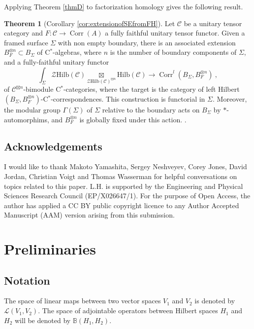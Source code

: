 \documentclass[a4paper,11pt,reqno]{amsart}
\numberwithin{equation}{section}
\theoremstyle{remark}
\theoremstyle{definition}
\newtheorem{theoremAlph}{Theorem}
\newcommand{\bB}{\mathbb B}
\newcommand{\cC}{\mathcal C}
\newcommand{\cL}{\mathcal L}
\newcommand{\cZ}{\mathcal Z}
\DeclareMathOperator{\Corr}{Corr}
\newcommand{\Hilb}{\mathrm{Hilb}}
\begin{document}
Applying Theorem \ref{thmD} to factorization homology gives the following result.

\begin{theoremAlph}[Corollary \ref{cor:extensionofSEfromFH}]
	Let $\cC$ be a unitary tensor category and $F: \cC \to \Corr(A)$ a fully faithful unitary tensor functor. Given a framed surface $\Sigma$ with non empty boundary, there is an associated extension  $B_F^{\otimes n} \subset B_\Sigma$ of C$^*$-algebras, where $n$ is the number of boundary components of $\Sigma$, and a fully-faithful unitary functor
	\[
	\int_\Sigma \cZ \Hilb(\cC) \underset{\cZ \Hilb(\cC)^{\boxtimes n}}{\boxtimes} \Hilb(\cC) \to \Corr^l(B_\Sigma,B_F^{\otimes n}) \ ,
	\]
	of $\cC^{\boxtimes n}$-bimodule C$^*$-categories, where the target is the category of left Hilbert $(B_\Sigma,B_F^{\otimes n})$-C$^*$-correspondences. This construction is functorial in $\Sigma$. Moreover, the modular group $\Gamma(\Sigma)$ of $\Sigma$ relative to the boundary acts on $B_\Sigma$ by $*$-automorphims, and $B_F^{\otimes n}$ is globally fixed under this action. 
	\label{thmE}. 
\end{theoremAlph}




\subsection{Acknowledgements}
I would like to thank Makoto Yamashita, Sergey Neshveyev, Corey Jones, David Jordan, Christian Voigt and Thomas Wasserman for helpful conversations on topics related to this paper.  L.H. is supported by the Engineering and Physical Sciences Research Council (EP/X026647/1). For the purpose of Open Access, the author has applied a CC BY public copyright licence to any Author Accepted Manuscript (AAM) version arising from this submission.



\section{Preliminaries}

\subsection{Notation}

The space of linear maps between two vector spaces $V_1$ and $V_2$ is denoted by $\cL(V_1,V_2)$. The space of adjointable operators between Hilbert spaces $H_1$ and $H_2$ will be denoted by $\bB(H_1,H_2)$.
\end{document}
